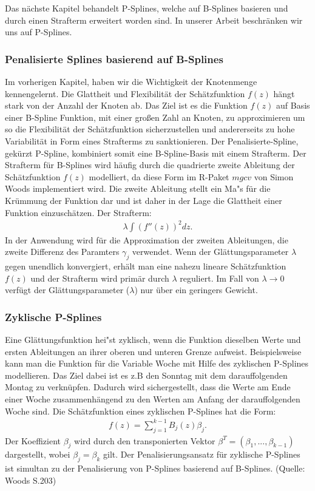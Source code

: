 \documentclass[12pt]{scrreprt}
\begin{document}
\noindent Das nächste Kapitel behandelt P-Splines, welche auf B-Splines basieren und durch einen Strafterm erweitert worden sind. In unserer Arbeit beschränken wir uns auf P-Splines.
\subsubsection{Penalisierte Splines basierend auf B-Splines}
Im vorherigen Kapitel, haben wir die Wichtigkeit der Knotenmenge kennengelernt. Die Glattheit und Flexibilität der Schätzfunktion $f(z)$ hängt stark von der Anzahl der Knoten ab. Das Ziel ist es die Funktion $f(z)$ auf Basis einer B-Spline Funktion, mit einer großen Zahl an Knoten, zu approximieren um so die Flexibilität der Schätzfunktion sicherzustellen und andererseits zu hohe Variabilität in Form eines Strafterms zu sanktionieren. Der Penalisierte-Spline, gekürzt P-Spline, kombiniert somit eine B-Spline-Basis mit einem Strafterm. Der Strafterm für B-Splines wird häufig durch die quadrierte zweite Ableitung der Schätzfunktion $f(z)$ modelliert, da diese Form im R-Paket $mgcv$ von Simon Woods implementiert wird. Die zweite Ableitung stellt ein Ma"s für die Krümmung der Funktion dar und ist daher in der Lage die Glattheit einer Funktion einzuschätzen.
Der Strafterm: 
\begin{align}
\lambda\int(f''(z))^2dz.
\end{align}
In der Anwendung wird für die Approximation der zweiten Ableitungen, die zweite Differenz des Paramters $\gamma_{j}$ verwendet. Wenn der Glättungsparameter $\lambda$ gegen unendlich konvergiert, erhält man eine nahezu lineare Schätzfunktion $f(z)$ und der Strafterm wird primär durch $\lambda$ reguliert. Im Fall von $\lambda \to 0$ verfügt der Glättungsparameter ($\lambda$) nur über ein geringers Gewicht.
\subsubsection{Zyklische P-Splines}
Eine Glättungsfunktion hei"st zyklisch, wenn die Funktion dieselben Werte und ersten Ableitungen an ihrer oberen und unteren Grenze aufweist. Beispielsweise kann man die Funktion für die Variable Woche mit Hilfe des zyklischen P-Splines modellieren. Das Ziel dabei ist es z.B den Sonntag mit dem darauffolgenden Montag zu verknüpfen. Dadurch wird sichergestellt, dass die Werte am Ende einer Woche zusammenhängend zu den Werten am Anfang der darauffolgenden Woche sind. 
Die Schätzfunktion eines zyklischen P-Splines hat die Form:
\begin{align}
f(z)=\sum_{j=1}^{k-1}B_{j}(z)\beta_{j}.
\end{align}
Der Koeffizient $\beta_{j}$ wird durch den transponierten Vektor $\beta^T=(\beta_{1},...,\beta_{k-1})$ dargestellt, wobei $\beta_{j}=\beta_{k}$ gilt.
Der Penalisierungsansatz für zyklische P-Splines ist simultan zu der Penalisierung von P-Splines basierend auf B-Splines. (Quelle: Woods S.203)
\end{document}
